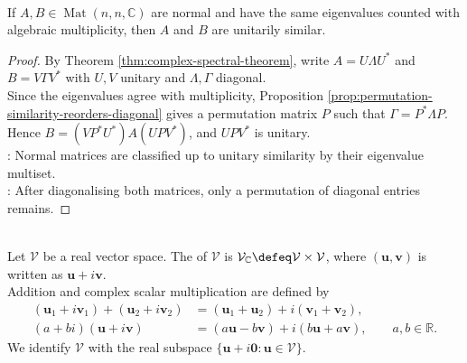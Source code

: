 \begin{corollary} \label{cor:normal-matrices-same-spectrum-unitarily-similar} \\
If $A,B\in\operatorname{Mat}(n,n,\mathbb{C})$ are normal and have the same eigenvalues counted with algebraic multiplicity, then $A$ and $B$ are unitarily similar.
\begin{proof}
By Theorem \ref{thm:complex-spectral-theorem}, write $A=U\Lambda U^*$ and $B=V\Gamma V^*$ with $U,V$ unitary and $\Lambda,\Gamma$ diagonal.\\
Since the eigenvalues agree with multiplicity, Proposition \ref{prop:permutation-similarity-reorders-diagonal} gives a permutation matrix $P$ such that $\Gamma=P^*\Lambda P$.\\
Hence $B=(VP^*U^*)A(UPV^*)$, and $UPV^*$ is unitary.\\
: Normal matrices are classified up to unitary similarity by their eigenvalue multiset.\\
: After diagonalising both matrices, only a permutation of diagonal entries remains.
\end{proof}
\end{corollary}

\begin{definition} \label{def:complexification-real-vector-space} \\
Let $\mathcal{V}$ be a real vector space. The  of $\mathcal{V}$ is $\mathcal{V}_{\mathbb{C}}\defeq \mathcal{V}\times\mathcal{V}$, where $(\mathbf{u},\mathbf{v})$ is written as $\mathbf{u}+i\mathbf{v}$.\\
Addition and complex scalar multiplication are defined by
\begin{align}
(\mathbf{u}_1+i\mathbf{v}_1)+(\mathbf{u}_2+i\mathbf{v}_2)
&=(\mathbf{u}_1+\mathbf{u}_2)+i(\mathbf{v}_1+\mathbf{v}_2), \nonumber\\
(a+bi)(\mathbf{u}+i\mathbf{v})
&=(a\mathbf{u}-b\mathbf{v})+i(b\mathbf{u}+a\mathbf{v}),
\qquad a,b\in\mathbb{R}.
\nonumber
\end{align}
We identify $\mathcal{V}$ with the real subspace $\{\mathbf{u}+i\mathbf{0}:\mathbf{u}\in\mathcal{V}\}$.
\end{definition}

